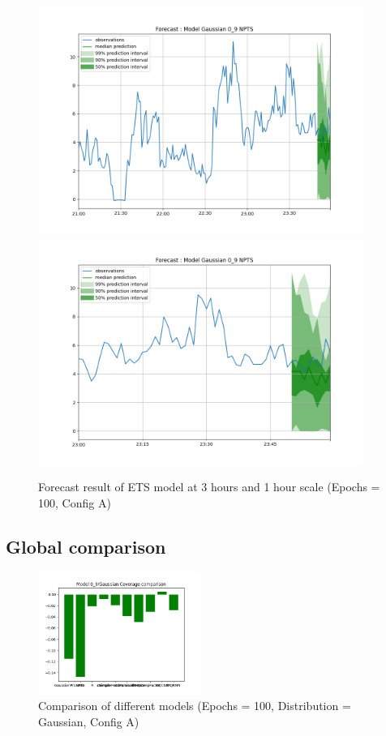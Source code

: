 \begin{figure}[H]
    \centering
    \includegraphics[width=400px]{plots/forecast/a/model/Gaussian/0_9/NPTS/180.png}
    \includegraphics[width=400px]{plots/forecast/a/model/Gaussian/0_9/NPTS/60.png}
    \caption{Forecast result of ETS model at 3 hours and 1 hour scale (Epochs = 100, Config A)}
    \label{fig:ets}
\end{figure}

\subsection{Global comparison}

\begin{figure}[H]
    \centering
    \includegraphics[width=200px]{plots/hist/a/model/0_9/Gaussian/Coverage.png}
    \caption{Comparison of different models (Epochs = 100, Distribution = Gaussian, Config A)}
    \label{fig:comp_mqcnn}
\end{figure}

